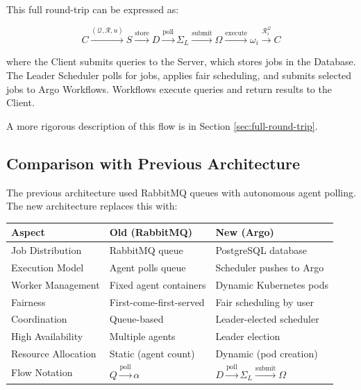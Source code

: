 \documentclass[11pt]{article}
\begin{document}
This full round-trip can be expressed as:

\begin{equation}
  C \xrightarrow{(\mathcal{Q}, \mathcal{R}, u)} S
  \xrightarrow{\text{store}} D
  \xrightarrow{\text{poll}} \Sigma_L
  \xrightarrow{\text{submit}} \Omega
  \xrightarrow{\text{execute}} \omega_i
  \xrightarrow{\mathcal{R}_i^{\mathcal{Q}}} C
\end{equation}

where the Client submits queries to the Server, which stores jobs in the Database. The Leader Scheduler polls for jobs, applies fair scheduling, and submits selected jobs to Argo Workflows. Workflows execute queries and return results to the Client.

A more rigorous description of this flow is in Section \ref{sec:full-round-trip}.

\subsection{Comparison with Previous Architecture}

The previous architecture used RabbitMQ queues with autonomous agent polling. The new architecture replaces this with:

\begin{center}
\begin{tabular}{p{5cm}|p{5cm}|p{5cm}}
\toprule
\textbf{Aspect} & \textbf{Old (RabbitMQ)} & \textbf{New (Argo)} \\
\midrule
Job Distribution & RabbitMQ queue & PostgreSQL database \\
Execution Model & Agent polls queue & Scheduler pushes to Argo \\
Worker Management & Fixed agent containers & Dynamic Kubernetes pods \\
Fairness & First-come-first-served & Fair scheduling by user \\
Coordination & Queue-based & Leader-elected scheduler \\
High Availability & Multiple agents & Leader election \\
Resource Allocation & Static (agent count) & Dynamic (pod creation) \\
\midrule
Flow Notation & $Q \xrightarrow{\text{poll}} \alpha$ & $D \xrightarrow{\text{poll}} \Sigma_L \xrightarrow{\text{submit}} \Omega$ \\
\bottomrule
\end{tabular}
\end{center}
\end{document}
